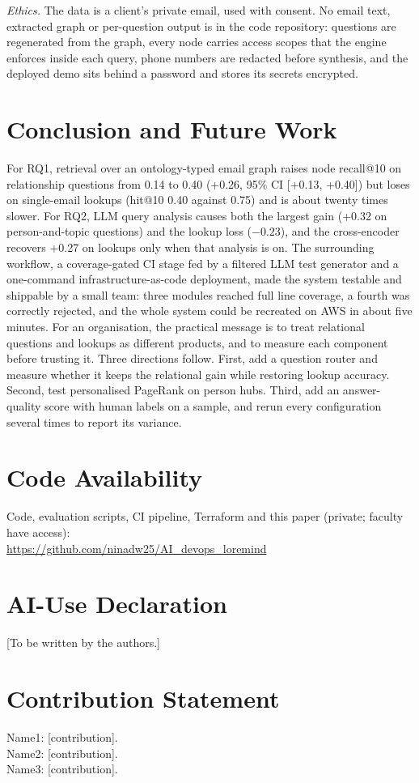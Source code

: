 \documentclass[12pt,onecolumn,draftclsnofoot]{IEEEtran}
\begin{document}
\emph{Ethics.} The data is a client's private email, used with consent. No email text, extracted graph or per-question output is in the code repository: questions are regenerated from the graph, every node carries access scopes that the engine enforces inside each query, phone numbers are redacted before synthesis, and the deployed demo sits behind a password and stores its secrets encrypted.

\section{Conclusion and Future Work}

For RQ1, retrieval over an ontology-typed email graph raises node recall@10 on relationship questions from 0.14 to 0.40 (+0.26, 95\% CI [+0.13, +0.40]) but loses on single-email lookups (hit@10 0.40 against 0.75) and is about twenty times slower. For RQ2, LLM query analysis causes both the largest gain (+0.32 on person-and-topic questions) and the lookup loss ($-0.23$), and the cross-encoder recovers +0.27 on lookups only when that analysis is on. The surrounding workflow, a coverage-gated CI stage fed by a filtered LLM test generator and a one-command infrastructure-as-code deployment, made the system testable and shippable by a small team: three modules reached full line coverage, a fourth was correctly rejected, and the whole system could be recreated on AWS in about five minutes. For an organisation, the practical message is to treat relational questions and lookups as different products, and to measure each component before trusting it. Three directions follow. First, add a question router and measure whether it keeps the relational gain while restoring lookup accuracy. Second, test personalised PageRank on person hubs. Third, add an answer-quality score with human labels on a sample, and rerun every configuration several times to report its variance.

\section*{Code Availability}
Code, evaluation scripts, CI pipeline, Terraform and this paper (private; faculty have access):\\
\url{https://github.com/ninadw25/AI_devops_loremind}

\section*{AI-Use Declaration}
[To be written by the authors.]

\section*{Contribution Statement}
\noindent Name1: [contribution].\\
Name2: [contribution].\\
Name3: [contribution].



\end{document}
